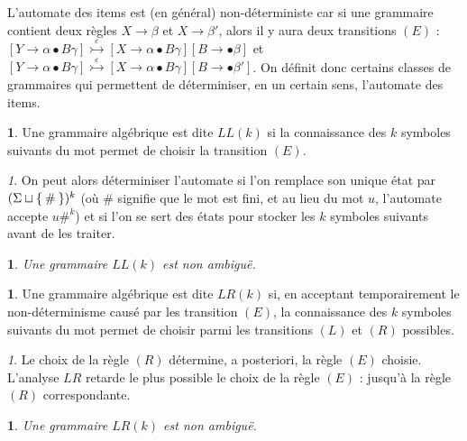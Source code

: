 \documentclass[11pt,a4paper]{article}
\theoremstyle{plain}
\theoremstyle{definition}
\newtheorem{defn}[thm]{\protect\definitionname}
\theoremstyle{definition}
\theoremstyle{remark}
\theoremstyle{remark}
\newtheorem{rem}[thm]{\protect\remarkname}
\theoremstyle{plain}
\theoremstyle{plain}
\newtheorem{prop}[thm]{\protect\propositionname}
\theoremstyle{plain}
\theoremstyle{remark}
\providecommand{\definitionname}{Définition}
\providecommand{\propositionname}{Proposition}
\providecommand{\remarkname}{Remarque}
\begin{document}
L'automate des items est (en général) non-déterministe car si une grammaire contient deux règles $X\to \beta$ et $X\to \beta'$, alors il y aura deux transitions $(E)$ : $\left[Y\to\alpha\bullet B\gamma\right]\overset{\varepsilon}{\rightarrowtail}\left[X\to\alpha\bullet B\gamma\right]\left[B\to\bullet\beta\right]$ et $\left[Y\to\alpha\bullet B\gamma\right]\overset{\varepsilon}{\rightarrowtail}\left[X\to\alpha\bullet B\gamma\right]\left[B\to\bullet\beta'\right]$. On définit donc certains classes de grammaires qui permettent de déterminiser, en un certain sens, l'automate des items.

\begin{defn}
	Une grammaire algébrique est dite \emph{$LL(k)$} si la connaissance des $k$ symboles suivants du mot permet de choisir la transition $(E)$.
\end{defn}

\begin{rem}
	On peut alors déterminiser l'automate si l'on remplace son unique état par $(\Sigma\sqcup \Set{\#})^k$ (où $\#$ signifie que le mot est fini, et au lieu du mot $u$, l'automate accepte $u\#^k$) et si l'on se sert des états pour stocker les $k$ symboles suivants avant de les traiter.
\end{rem}

\begin{prop}
	Une grammaire $LL(k)$ est non ambiguë.
\end{prop}

\begin{defn}
	Une grammaire algébrique est dite \emph{$LR(k)$} si, en acceptant temporairement le non-déterminisme causé par les transition $(E)$, la connaissance des $k$ symboles suivants du mot permet de choisir parmi les transitions $(L)$ et $(R)$ possibles.
\end{defn}

\begin{rem}
	Le choix de la règle $(R)$ détermine, a posteriori, la règle $(E)$ choisie. L'analyse $LR$ retarde le plus possible le choix de la règle $(E)$ : jusqu'à la règle $(R)$ correspondante.
\end{rem}

\begin{prop}
	Une grammaire $LR(k)$ est non ambiguë.
\end{prop}

\newpage
\nocite{*}
\printbibliography
\end{document}
